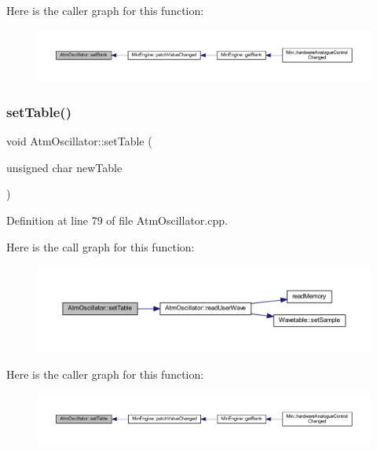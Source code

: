 Here is the caller graph for this function\+:
\nopagebreak
\begin{figure}[H]
\begin{center}
\leavevmode
\includegraphics[width=350pt]{d8/d5f/class_atm_oscillator_a9f65ae9f2132c46f73b776a869b5bf21_icgraph}
\end{center}
\end{figure}
\mbox{\label{class_atm_oscillator_ac4248a3cd6fceea6ee677e74faba4af0}} 
\subsubsection{\texorpdfstring{set\+Table()}{setTable()}}
{\footnotesize\ttfamily void Atm\+Oscillator\+::set\+Table (\begin{DoxyParamCaption}\item[{unsigned char}]{new\+Table }\end{DoxyParamCaption})}



Definition at line 79 of file Atm\+Oscillator.\+cpp.

Here is the call graph for this function\+:
\nopagebreak
\begin{figure}[H]
\begin{center}
\leavevmode
\includegraphics[width=350pt]{d8/d5f/class_atm_oscillator_ac4248a3cd6fceea6ee677e74faba4af0_cgraph}
\end{center}
\end{figure}
Here is the caller graph for this function\+:
\nopagebreak
\begin{figure}[H]
\begin{center}
\leavevmode
\includegraphics[width=350pt]{d8/d5f/class_atm_oscillator_ac4248a3cd6fceea6ee677e74faba4af0_icgraph}
\end{center}
\end{figure}
\mbox{\label{class_atm_oscillator_aafaccbb54d52f2c0eb07eb968498eef4}} 
